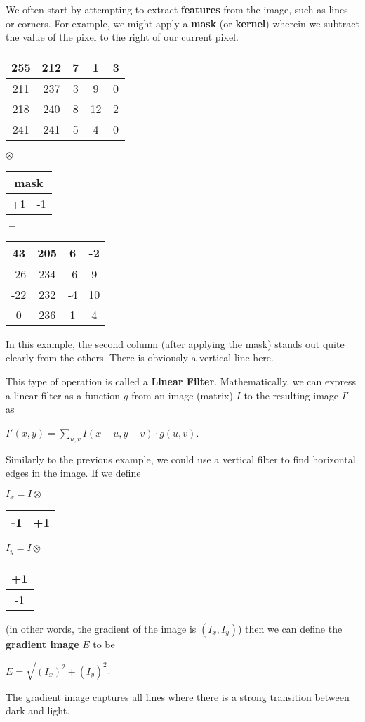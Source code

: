 \documentclass[10pt,a4paper]{article}
\begin{document}
We often start by attempting to extract \textbf{features} from the image, such as lines or corners. For example, we might apply a \textbf{mask} (or \textbf{kernel}) wherein we subtract the value of the pixel to the right of our current pixel.
\begin{center}
\begin{tabular}{|c|c|c|c|c|}
\hline
255 & 212 & 7 & 1 & 3 \\
\hline
211 & 237 & 3 & 9 & 0 \\
\hline
218 & 240 & 8 & 12 & 2 \\
\hline
241 & 241 & 5 & 4 & 0 \\
\hline
\end{tabular}
$\otimes$
\begin{tabular}{|c|c|}
\multicolumn{2}{c}{\textbf{mask}} \\
\hline
+1 & -1 \\
\hline
\end{tabular}
$=$
\begin{tabular}{|c|c|c|c|}
\hline
43 & 205 & 6 & -2 \\
\hline
-26 & 234 & -6 & 9 \\
\hline
-22 & 232 & -4 & 10 \\
\hline
0 & 236 & 1 & 4 \\
\hline
\end{tabular}
\end{center}
In this example, the second column (after applying the mask) stands out quite clearly from the others. There is obviously a vertical line here.

This type of operation is called a \textbf{Linear Filter}. Mathematically, we can express a linear filter as a function $g$ from an image (matrix) $I$ to the resulting image $I'$ as
\begin{center}
$\displaystyle I'(x,y) = \sum_{u,v} I(x-u, y-v) \cdot g(u,v)$.
\end{center}

Similarly to the previous example, we could use a vertical filter to find horizontal edges in the image. If we define
\begin{center}
$I_x = I \otimes$
\begin{tabular}{|c|c|}
\hline
-1 & +1 \\
\hline
\end{tabular}

$I_y = I \otimes$
\begin{tabular}{|@{}c@{}|}
\hline
+1 \\
\hline
-1 \\
\hline
\end{tabular}
\end{center}
(in other words, the gradient of the image is $(I_x, I_y)$) then we can define the \textbf{gradient image} $E$ to be
\begin{center}
$\displaystyle E = \sqrt{(I_x)^2 + (I_y)^2}$.
\end{center}
The gradient image captures all lines where there is a strong transition between dark and light.
\end{document}
